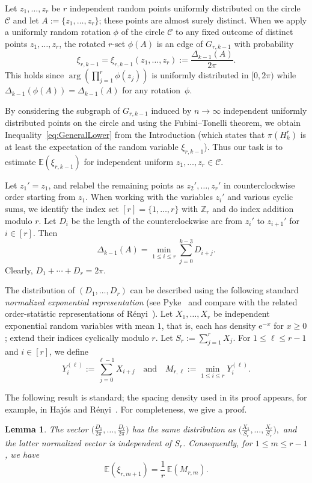 \documentclass[12pt,a4paper]{article}
\numberwithin{equation}{section}
\newtheorem{lemma}[theorem]{Lemma}
\theoremstyle{definition}
\theoremstyle{remark}
\newcommand{\Z}[1]{\mathbb Z_{#1}}
\newcommand{\me}{\mathrm{e}}
\begin{document}
Let $z_1,\dots,z_r$ be $r$ independent random points uniformly distributed on the circle~$\mathcal C$ and let $A:=\{z_1,\dots,z_r\}$; these points are almost surely distinct. When we apply a uniformly random rotation $\phi$ of the circle $\mathcal C$ to any fixed outcome of distinct points $z_1,\dots,z_r$, the rotated $r$-set $\phi(A)$ is an edge of $G_{r,k-1}$ with probability 
\[
\xi_{r,k-1}=\xi_{r,k-1}(z_1,\dots,z_r):=\frac{\Delta_{k-1}(A)}{2\pi}.
\]
This holds since $\arg(\prod_{j=1}^r \phi(z_j))$ is uniformly distributed in $[0,2\pi)$ while $\Delta_{k-1}(\phi(A))=\Delta_{k-1}(A)$ for any rotation~$\phi$. 

By considering the subgraph of $G_{r,k-1}$ induced by $n\to\infty$ independent uniformly distributed points on the circle and using the Fubini--Tonelli theorem, we obtain Inequality~\eqref{eq:GeneralLower} from the Introduction (which states that $\pi(H_k^r)$ is at least the expectation of the random variable $\xi_{r,k-1}$).
Thus our task is to estimate $\mathbb E(\xi_{r,k-1})$ for independent uniform $z_1,\dots,z_r\in\mathcal C$.

Let $z_1'=z_1$, and relabel the remaining points as $z_2',\dots,z_r'$ in counterclockwise order starting from $z_1$. When working with the variables $z_i'$ and various cyclic sums, we identify the index set $[r]=\{1,\dots,r\}$ with $\Z{r}$ and do index addition modulo $r$. 
Let $D_i$ be the length of the counterclockwise arc from $z_i'$ to $z_{i+1}'$ for $i\in [r]$. Then
\[\Delta_{k-1}(A)=\min_{1\le i\le r} \sum_{j=0}^{k-3}D_{i+j}.\]
Clearly, $D_1+\cdots +D_r=2\pi$.

The distribution of $(D_1,\dots,D_r)$ can be described using the following standard \emph{normalized exponential representation} (see Pyke~\cite[Section~4.1]{Pyke65} and compare with the related order-statistic representations of R\'enyi~\cite{Renyi53}).
Let $X_1,\ldots,X_r$ be independent exponential random variables with mean $1$, that is, each has density $\me^{-x}$ for $x\ge0$; extend their indices cyclically modulo $r$.  
Let $S_r:=\sum_{j=1}^rX_j$.
For $1\le\ell\le r-1$ and $i\in [r]$, we define
$$Y_i^{(\ell)}:=\sum_{j=0}^{\ell-1}X_{i+j}
\quad \text{and} \quad
M_{r,\ell}:=\min_{1\le i\le r}Y_i^{(\ell)}.$$

The following result is standard; the spacing density used in its proof appears, for example, in Haj{\'o}s and R{\'e}nyi~\cite[Eq.~(6)]{HajosRenyi54}. For completeness, we give a proof.


\begin{lemma}\label{lem:renyi1953}
The vector $\big(\frac{D_1}{2\pi },\ldots, \frac{D_r}{2\pi }\big)$ has the same distribution as
$\big(\frac{X_1}{S_r},\ldots,\frac{X_r}{S_r}\big),$
and the latter normalized vector is independent of $S_r$.  Consequently, for $1\le m\le r-1$, we have
\begin{equation}\label{eq:EXi}
        \mathbb{E}(\xi_{r,m+1})=\frac1r\,\mathbb{E}(M_{r,m}).
\end{equation}
\end{lemma}
\end{document}
